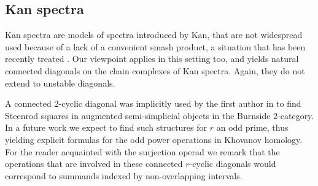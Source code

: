 

\subsection{Kan spectra}

Kan spectra \cite{Kan1963} are models of spectra introduced by Kan, that are not widespread used because of a lack of a convenient smash product, a situation that has been recently treated \cite{CKP2023}.
Our viewpoint applies in this setting too, and yields natural connected diagonals on the chain complexes of Kan spectra.
Again, they do not extend to unstable diagonals. 


A connected $2$-cyclic diagonal was implicitly used by the first author in \cite{cantero-moran2020khovanov} to find Steenrod squares in augmented semi-simplicial objects in the Burnside $2$-category.
In a future work we expect to find such structures for $r$ an odd prime, thus yielding explicit formulas for the odd power operations in Khovanov homology.
For the reader acquainted with the surjection operad we remark that the operations that are involved in these connected $r$-cyclic diagonals would correspond to summands indexed by non-overlapping intervals.

